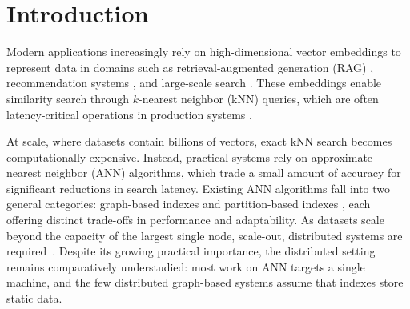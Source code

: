 \documentclass[sigconf,review,anonymous]{acmart}
\begin{document}



\maketitle

\section{Introduction}
Modern applications increasingly rely on high-dimensional vector embeddings to represent data in domains such as retrieval-augmented generation (RAG) \cite{lewis2020retrieval, gao2023retrieval}, recommendation systems \cite{rajput2023recommender, okura2017embedding}, and large-scale search \cite{johnson2019billion, gordo2016deep}. These embeddings enable similarity search through $k$-nearest neighbor (kNN) queries, which are often latency-critical operations in production systems \cite{jayaram2019diskann, singh2021freshdiskann}.

At scale, where datasets contain billions of vectors, exact kNN search becomes computationally expensive. Instead, practical systems rely on approximate nearest neighbor (ANN) algorithms, which trade a small amount of accuracy for significant reductions in search latency. Existing ANN algorithms fall into two general categories: graph-based indexes \cite{malkov2018efficient, jayaram2019diskann, wang2021comprehensive} and partition-based indexes \cite{jegou2011searching, baranchuk2018revisiting}, each offering distinct trade-offs in performance and adaptability. As datasets scale beyond the capacity of the largest single node, scale-out, distributed systems are required~\cite{deng2019pyramid, chen2021spann, xu2023spfresh, mohoney2025quake, gottesbueren2025unleashing}. Despite its growing practical importance, the distributed setting remains comparatively understudied: most work on ANN targets a single machine, and the few distributed graph-based systems assume that indexes store static data. %
\end{document}
